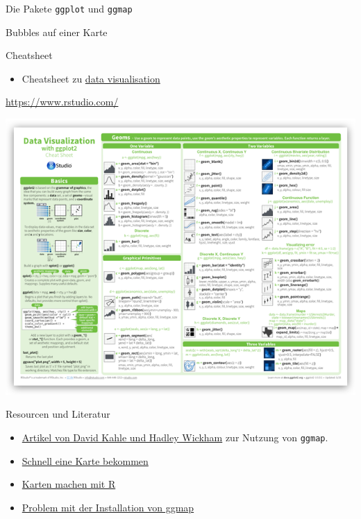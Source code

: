 \documentclass[ignorenonframetext,]{beamer}
\providecommand{\tightlist}{%
\setlength{\itemsep}{0pt}\setlength{\parskip}{0pt}}
\begin{document}
\begin{frame}[fragile]{Die Pakete \texttt{ggplot} und \texttt{ggmap}}
\begin{block}{Bubbles auf einer Karte}
\end{block}

\begin{block}{Cheatsheet}

\begin{itemize}
\tightlist
\item
  Cheatsheet zu
  \href{https://www.rstudio.com/wp-content/uploads/2015/04/ggplot2-cheatsheet.pdf}{data
  visualisation}
\end{itemize}

\url{https://www.rstudio.com/}

\includegraphics{./tex2pdf.9796/4d72d67e64b35d369cc1d2ffe340e20dfd9cd089.png}

\end{block}

\begin{block}{Resourcen und Literatur}

\begin{itemize}
\item
  \href{http://journal.r-project.org/archive/2013-1/kahle-wickham.pdf}{Artikel
  von David Kahle und Hadley Wickham} zur Nutzung von \texttt{ggmap}.
\item
  \href{http://rpackages.ianhowson.com/cran/ggmap/man/get_map.html}{Schnell
  eine Karte bekommen}
\item
  \href{http://www.kevjohnson.org/making-maps-in-r-part-2/}{Karten
  machen mit R}
\item
  \href{http://stackoverflow.com/questions/40642850/ggmap-error-geomrasterann-was-built-with-an-incompatible-version-of-ggproto}{Problem
  mit der Installation von ggmap}
\end{itemize}


\end{block}
\end{frame}
\end{document}
